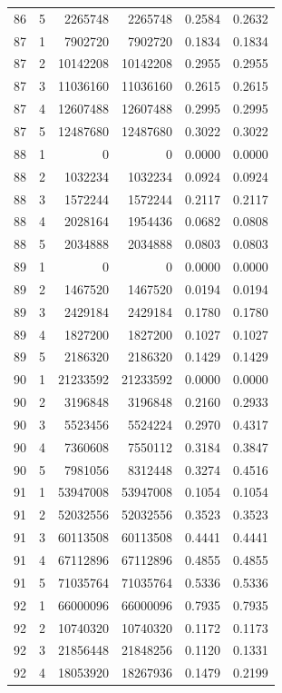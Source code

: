 \begin{longtable}{rrrrrr}
86 & 5 & 2265748 & 2265748 & 0.2584 & 0.2632 \\
87 & 1 & 7902720 & 7902720 & 0.1834 & 0.1834 \\
87 & 2 & 10142208 & 10142208 & 0.2955 & 0.2955 \\
87 & 3 & 11036160 & 11036160 & 0.2615 & 0.2615 \\
87 & 4 & 12607488 & 12607488 & 0.2995 & 0.2995 \\
87 & 5 & 12487680 & 12487680 & 0.3022 & 0.3022 \\
88 & 1 & 0 & 0 & 0.0000 & 0.0000 \\
88 & 2 & 1032234 & 1032234 & 0.0924 & 0.0924 \\
88 & 3 & 1572244 & 1572244 & 0.2117 & 0.2117 \\
88 & 4 & 2028164 & 1954436 & 0.0682 & 0.0808 \\
88 & 5 & 2034888 & 2034888 & 0.0803 & 0.0803 \\
89 & 1 & 0 & 0 & 0.0000 & 0.0000 \\
89 & 2 & 1467520 & 1467520 & 0.0194 & 0.0194 \\
89 & 3 & 2429184 & 2429184 & 0.1780 & 0.1780 \\
89 & 4 & 1827200 & 1827200 & 0.1027 & 0.1027 \\
89 & 5 & 2186320 & 2186320 & 0.1429 & 0.1429 \\
90 & 1 & 21233592 & 21233592 & 0.0000 & 0.0000 \\
90 & 2 & 3196848 & 3196848 & 0.2160 & 0.2933 \\
90 & 3 & 5523456 & 5524224 & 0.2970 & 0.4317 \\
90 & 4 & 7360608 & 7550112 & 0.3184 & 0.3847 \\
90 & 5 & 7981056 & 8312448 & 0.3274 & 0.4516 \\
91 & 1 & 53947008 & 53947008 & 0.1054 & 0.1054 \\
91 & 2 & 52032556 & 52032556 & 0.3523 & 0.3523 \\
91 & 3 & 60113508 & 60113508 & 0.4441 & 0.4441 \\
91 & 4 & 67112896 & 67112896 & 0.4855 & 0.4855 \\
91 & 5 & 71035764 & 71035764 & 0.5336 & 0.5336 \\
92 & 1 & 66000096 & 66000096 & 0.7935 & 0.7935 \\
92 & 2 & 10740320 & 10740320 & 0.1172 & 0.1173 \\
92 & 3 & 21856448 & 21848256 & 0.1120 & 0.1331 \\
92 & 4 & 18053920 & 18267936 & 0.1479 & 0.2199 \\

\end{longtable}
